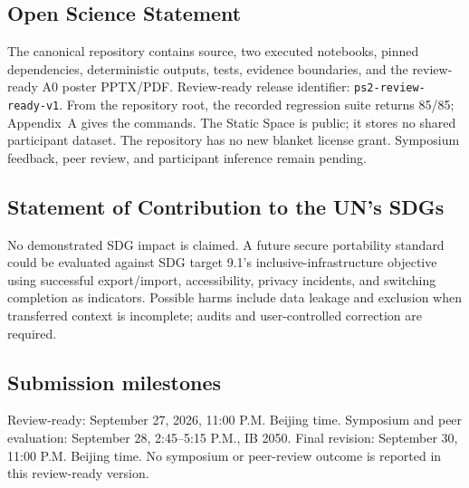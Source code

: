 \subsection*{Open Science Statement}
The canonical repository contains source, two executed notebooks, pinned dependencies, deterministic outputs, tests, evidence boundaries, and the review-ready A0 poster PPTX/PDF. Review-ready release identifier: \texttt{ps2-review-ready-v1}. From the repository root, the recorded regression suite returns 85/85; Appendix~A gives the commands. The Static Space is public; it stores no shared participant dataset. The repository has no new blanket license grant. Symposium feedback, peer review, and participant inference remain pending.

\subsection*{Statement of Contribution to the UN's SDGs}
No demonstrated SDG impact is claimed. A future secure portability standard could be evaluated against SDG target 9.1's inclusive-infrastructure objective~\cite{un_sdg} using successful export/import, accessibility, privacy incidents, and switching completion as indicators. Possible harms include data leakage and exclusion when transferred context is incomplete; audits and user-controlled correction are required.

\subsection*{Submission milestones}
Review-ready: September 27, 2026, 11:00 P.M. Beijing time. Symposium and peer evaluation: September 28, 2:45--5:15 P.M., IB 2050. Final revision: September 30, 11:00 P.M. Beijing time. No symposium or peer-review outcome is reported in this review-ready version.
